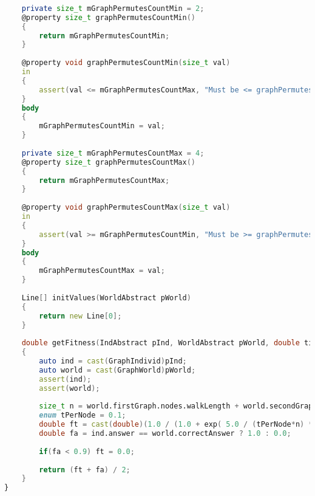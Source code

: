 \documentclass[russian,utf8,emptystyle]{eskdtext}
\begin{document}
\begin{lstlisting}[language=D]
    
    private size_t mGraphPermutesCountMin = 2;
    @property size_t graphPermutesCountMin()
    {
        return mGraphPermutesCountMin;
    }
    
    @property void graphPermutesCountMin(size_t val)
    in
    {
        assert(val <= mGraphPermutesCountMax, "Must be <= graphPermutesCountMax");
    }
    body
    {
        mGraphPermutesCountMin = val;
    }
    
    private size_t mGraphPermutesCountMax = 4;
    @property size_t graphPermutesCountMax()
    {
        return mGraphPermutesCountMax;
    }
    
    @property void graphPermutesCountMax(size_t val)
    in
    {
        assert(val >= mGraphPermutesCountMin, "Must be >= graphPermutesCountMin");
    }
    body
    {
        mGraphPermutesCountMax = val;
    }
    
    Line[] initValues(WorldAbstract pWorld)
    {
        return new Line[0];
    }
        
    double getFitness(IndAbstract pInd, WorldAbstract pWorld, double time)
    {
        auto ind = cast(GraphIndivid)pInd;
        auto world = cast(GraphWorld)pWorld;
        assert(ind); 
        assert(world);
        
        size_t n = world.firstGraph.nodes.walkLength + world.secondGraph.nodes.walkLength;
        enum tPerNode = 0.1;
        double ft = cast(double)(1.0 / (1.0 + exp( 5.0 / (tPerNode*n) * time - 5.0)));
        double fa = ind.answer == world.correctAnswer ? 1.0 : 0.0; 
        
        if(fa < 0.9) ft = 0.0;
        
        return (ft + fa) / 2;
    }
}
\end{lstlisting}
\end{document}

